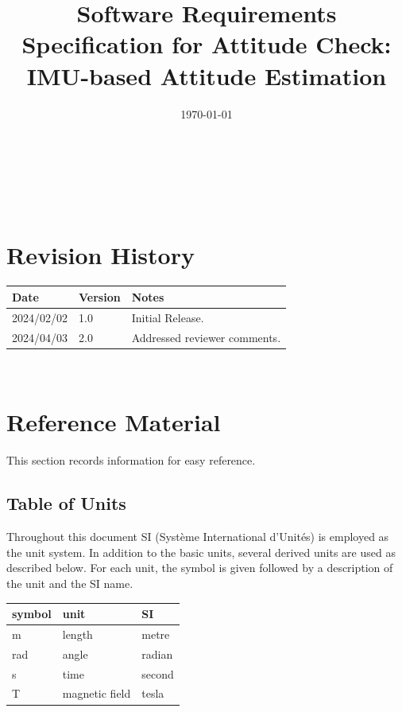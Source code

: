 \documentclass[12pt]{article}
\begin{document}
\title{Software Requirements Specification for Attitude Check: IMU-based Attitude Estimation}
\author{\authname}
\date{\today}

\maketitle

~\newpage


\tableofcontents

~\newpage

\section*{Revision History}

\begin{tabularx}{\textwidth}{p{3cm}p{2cm}X} \toprule {\bf Date} & {\bf Version} & {\bf Notes}\\
\midrule
2024/02/02 & 1.0 & Initial Release.\\
2024/04/03 & 2.0 & Addressed reviewer comments.\\
\bottomrule
\end{tabularx}

~\newpage

\section{Reference Material}

This section records information for easy reference.

\subsection{Table of Units}

Throughout this document SI (Syst\`{e}me International d'Unit\'{e}s) is employed as the unit system.
In addition to the basic units, several derived units are used as described below.  For each unit,
the symbol is given followed by a description of the unit and the SI name. ~\newline

\renewcommand{\arraystretch}{1.2}
  \noindent \begin{tabular}{l l l}
    \toprule
    \textbf{symbol} & \textbf{unit} & \textbf{SI}\\
    \midrule
    \si{\metre} & length & metre\\
    \si{\radian} & angle & radian\\
    \si{\second} & time & second\\
    \si{\tesla}      & magnetic field & tesla \\
    \bottomrule
  \end{tabular}
\end{document}
